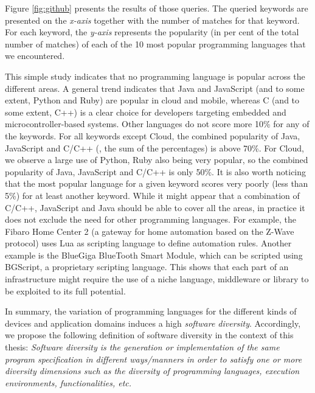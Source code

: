 Figure \ref{fig:github} presents the results of those queries. The queried keywords are presented on the \textit{x-axis} together with the number of matches for that keyword. For each keyword, the \textit{y-axis} represents the popularity (in per cent of the total number of matches) of each of the 10 most popular programming languages that we encountered.


This simple study indicates that no programming language is popular across the different areas. A general trend indicates that Java and JavaScript (and to some extent, Python and Ruby) are popular in cloud and mobile, whereas C (and to some extent, C++) is a clear choice for developers targeting embedded and microcontroller-based systems. Other languages do not score more 10\% for any of the keywords. 
For all keywords except Cloud, the combined popularity of Java, JavaScript and C/C++ (\ie, the sum
of the percentages) is above 70\%. For Cloud, we observe a large use of Python, Ruby also being very popular, so the combined popularity of Java, JavaScript and C/C++ is only 50\%. It is also worth noticing that the most popular language for a given keyword scores very poorly (less than 5\%) for at least another keyword. While it might appear that a combination of C/C++, JavaScript and Java should be able to cover all the areas, in practice it does not exclude the need for other programming languages. For example, the Fibaro Home Center 2 (a gateway for home automation based on the Z-Wave protocol) uses Lua as scripting language to define automation rules. Another example is the BlueGiga BlueTooth Smart Module, which can be scripted using BGScript, a proprietary scripting language. This shows that each part of an infrastructure might require the use of a niche language, middleware or library to be exploited to its full potential.


In summary, the variation of programming languages for the different kinds of devices and application domains induces a high \textit{software diversity}. Accordingly, we propose the following definition of software diversity in the context of this thesis: 
\textit{Software diversity is the generation or implementation of the same program specification in different ways/manners in order to satisfy one or more diversity dimensions such as the diversity of programming languages, execution environments, functionalities, etc. }
		

